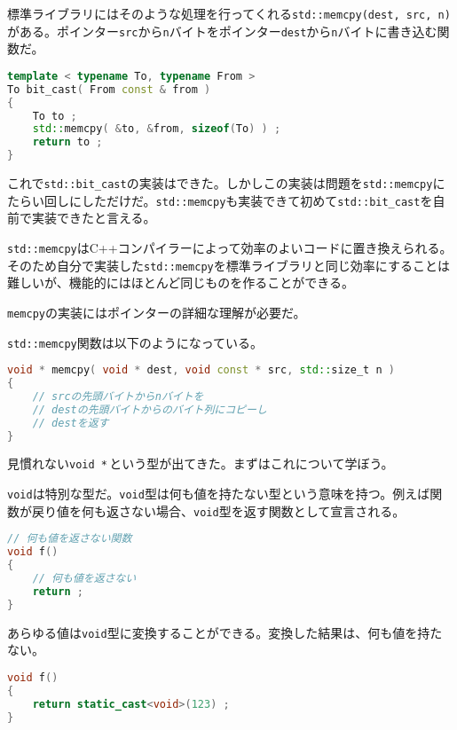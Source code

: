 標準ライブラリにはそのような処理を行ってくれる\texttt{std::memcpy(dest, src, n)}がある。ポインター\texttt{src}から\texttt{n}バイトをポインター\texttt{dest}から\texttt{n}バイトに書き込む関数だ。

\begin{lstlisting}[language={C++}]
template < typename To, typename From >
To bit_cast( From const & from )
{
    To to ;
    std::memcpy( &to, &from, sizeof(To) ) ;
    return to ;
}
\end{lstlisting}

これで\texttt{std::bit\_cast}の実装はできた。しかしこの実装は問題を\texttt{std::memcpy}にたらい回しにしただけだ。\texttt{std::memcpy}も実装できて初めて\texttt{std::bit\_cast}を自前で実装できたと言える。


\texttt{std::memcpy}はC++コンパイラーによって効率のよいコードに置き換えられる。そのため自分で実装した\texttt{std::memcpy}を標準ライブラリと同じ効率にすることは難しいが、機能的にはほとんど同じものを作ることができる。

\texttt{memcpy}の実装にはポインターの詳細な理解が必要だ。

\texttt{std::memcpy}関数は以下のようになっている。

\begin{lstlisting}[language={C++}]
void * memcpy( void * dest, void const * src, std::size_t n )
{
    // srcの先頭バイトからnバイトを
    // destの先頭バイトからのバイト列にコピーし
    // destを返す
}
\end{lstlisting}

見慣れない\texttt{void *}\,という型が出てきた。まずはこれについて学ぼう。


\texttt{void}は特別な型だ。\texttt{void}型は何も値を持たない型という意味を持つ。例えば関数が戻り値を何も返さない場合、\texttt{void}型を返す関数として宣言される。

\begin{lstlisting}[language={C++}]
// 何も値を返さない関数
void f()
{
    // 何も値を返さない
    return ;
}
\end{lstlisting}

あらゆる値は\texttt{void}型に変換することができる。変換した結果は、何も値を持たない。

\begin{lstlisting}[language={C++}]
void f()
{
    return static_cast<void>(123) ;
}
\end{lstlisting}

